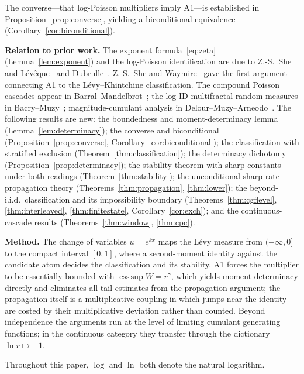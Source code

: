 \documentclass[pdflatex,sn-mathphys-num]{sn-jnl}
\theoremstyle{thmstyleone}
\theoremstyle{thmstyletwo}
\theoremstyle{thmstylethree}
\DeclareMathOperator*{\esssup}{ess\,sup}
\begin{document}
The converse---that log-Poisson multipliers imply
A1---is established in Proposition~\ref{prop:converse}, yielding a
biconditional equivalence (Corollary~\ref{cor:biconditional}).

\smallskip
\noindent\textbf{Relation to prior work.}
The exponent formula~\eqref{eq:zeta} (Lemma~\ref{lem:exponent})
and the log-Poisson identification are due to
Z.-S.~She and L\'ev\^eque~\cite{SL94} and Dubrulle~\cite{Dub94}.
Z.-S.~She and Waymire~\cite{SW95} gave the first argument connecting
A1 to the L\'evy--Khintchine classification.  The compound Poisson
cascades appear in Barral--Mandelbrot~\cite{BM02}; the log-ID
multifractal random measures in Bacry--Muzy~\cite{BM03,MB02};
magnitude-cumulant analysis in Delour--Muzy--Arneodo~\cite{DMA01}.
The following results are new: the boundedness and
moment-determinacy lemma (Lemma~\ref{lem:determinacy}); the converse
and biconditional (Proposition~\ref{prop:converse},
Corollary~\ref{cor:biconditional}); the classification with
stratified exclusion (Theorem~\ref{thm:classification}); the
determinacy dichotomy (Proposition~\ref{prop:determinacy}); the
stability theorem with sharp constants under both readings
(Theorem~\ref{thm:stability}); the unconditional sharp-rate
propagation theory (Theorems~\ref{thm:propagation},
\ref{thm:lower}); the beyond-i.i.d.\ classification and its
impossibility boundary (Theorems~\ref{thm:cgflevel},
\ref{thm:interleaved}, \ref{thm:finitestate},
Corollary~\ref{cor:exch}); and the continuous-cascade results
(Theorems~\ref{thm:window}, \ref{thm:cpc}).

\smallskip
\noindent\textbf{Method.}
The change of variables $u = e^{kx}$ maps the L\'evy measure from
$(-\infty,0]$ to the compact interval $[0,1]$, where a second-moment
identity against the candidate atom decides the classification and
its stability.  A1 forces the multiplier to be essentially bounded
with $\esssup W = r^\gamma$, which yields moment determinacy
directly and eliminates all tail estimates from the propagation
argument; the propagation itself is a multiplicative coupling in
which jumps near the identity are costed by their multiplicative
deviation rather than counted.  Beyond independence the arguments
run at the level of limiting cumulant generating functions; in the
continuous category they transfer through the dictionary
$\ln r \mapsto -1$.

\smallskip
Throughout this paper, $\log$ and $\ln$ both denote the natural
logarithm.


\end{document}
